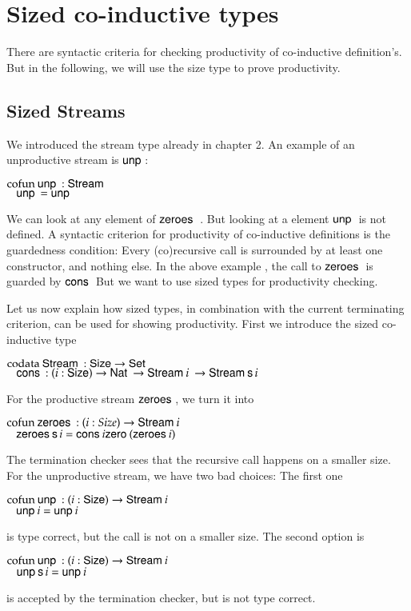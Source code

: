 \section{Sized co-inductive types}


There are syntactic criteria for checking productivity of co-inductive definition's.
But in the following, we will use the size type to prove productivity.

\subsection{Sized Streams}

We introduced the stream type already in chapter 2.
An example of an unproductive stream is $\mathsf{unp}\:$:
\begin{bsp}
$\mathrm{cofun}\: \mathsf{unp}\: : \mathsf{Stream}\: $ \\
$\hspace*{3mm} \mathsf{unp}\: = \mathsf{unp}\:$
\end{bsp}
We can look at any element of $\mathsf{zeroes}\:$ .
But looking at a element $\mathsf{unp}\:$ is not defined. 
A syntactic criterion for productivity of co-inductive definitions is the guardedness condition:
Every (co)recursive call is surrounded by at least one constructor, and nothing else.
In the above example , the call to $\mathsf{zeroes}\:$ is guarded by $\mathsf{cons}\:$
But we want to use sized types for productivity checking.

Let us now explain how sized types, in combination with the current terminating criterion, can be used for showing productivity.
First we introduce the sized co-inductive type 
\begin{bsp}
$\mathrm{codata}\: \mathsf{Stream}\: : \mathsf{Size} \rightarrow \mathsf{Set} $ \\
$\hspace*{3mm} \mathsf{cons}\: : ( i : \mathsf{Size} ) \rightarrow{\mathsf{Nat}\:\rightarrow\mathsf{Stream}\:i \: \rightarrow\mathsf{Stream}\:\mathsf{s}\,i } $
\end{bsp}
For the productive stream $\mathsf{zeroes}\:$, we turn it into
\begin{bsp}
$\mathrm{cofun}\: \mathsf{zeroes}\:: ( i : Size ) \rightarrow{\mathsf{Stream}\:i} $ \\
$\hspace*{3mm} \mathsf{zeroes}\: \mathsf{s}\, i = \mathsf{cons}\: i \mathsf{zero}\: (\mathsf{zeroes}\: i)$\\
\end{bsp}
The termination checker sees that the recursive call happens on a smaller size.
For the unproductive stream, we have two bad choices:
The first one
\begin{bsp}
$\mathrm{cofun}\: \mathsf{unp}\: : ( i : \mathsf{Size} ) \rightarrow{\mathsf{Stream}\:i}$ \\
$\hspace*{3mm} \mathsf{unp}\: i =  \mathsf{unp}\: i$
\end{bsp}
is type correct, but the call is not on a smaller size.
The second option is
\begin{bsp}
$\mathrm{cofun}\: \mathsf{unp}\: : ( i : \mathsf{Size} ) \rightarrow{\mathsf{Stream}\:i}$ \\
$\hspace*{3mm} \mathsf{unp}\: \mathsf{s}\, i = \mathsf{unp}\: i $
\end{bsp}
is accepted by the termination checker, but is not type correct.

